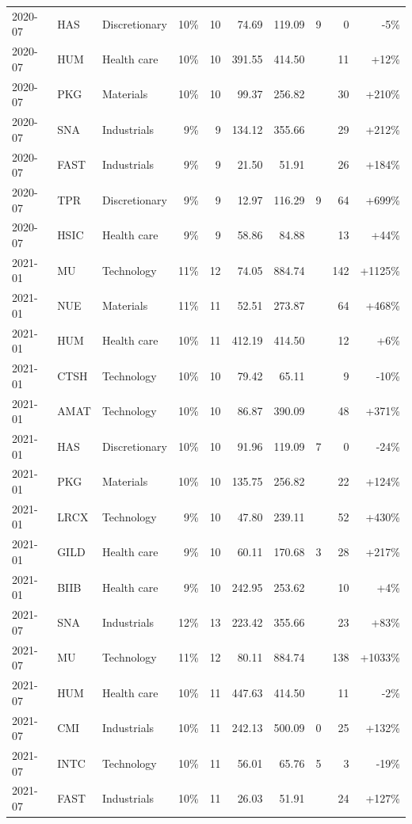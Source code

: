 \documentclass[11pt,a4paper]{article}
\begin{document}
{\begin{longtable}{l l l r r r r r r r}
2020-07 & HAS & Discretionary & 10\% & 10 & 74.69 & 119.09 & 9 & 0 & -5\% \\
2020-07 & HUM & Health care & 10\% & 10 & 391.55 & 414.50 &  & 11 & +12\% \\
2020-07 & PKG & Materials & 10\% & 10 & 99.37 & 256.82 &  & 30 & +210\% \\
2020-07 & SNA & Industrials & 9\% & 9 & 134.12 & 355.66 &  & 29 & +212\% \\
2020-07 & FAST & Industrials & 9\% & 9 & 21.50 & 51.91 &  & 26 & +184\% \\
2020-07 & TPR & Discretionary & 9\% & 9 & 12.97 & 116.29 & 9 & 64 & +699\% \\
2020-07 & HSIC & Health care & 9\% & 9 & 58.86 & 84.88 &  & 13 & +44\% \\
2021-01 & MU & Technology & 11\% & 12 & 74.05 & 884.74 &  & 142 & +1125\% \\
2021-01 & NUE & Materials & 11\% & 11 & 52.51 & 273.87 &  & 64 & +468\% \\
2021-01 & HUM & Health care & 10\% & 11 & 412.19 & 414.50 &  & 12 & +6\% \\
2021-01 & CTSH & Technology & 10\% & 10 & 79.42 & 65.11 &  & 9 & -10\% \\
2021-01 & AMAT & Technology & 10\% & 10 & 86.87 & 390.09 &  & 48 & +371\% \\
2021-01 & HAS & Discretionary & 10\% & 10 & 91.96 & 119.09 & 7 & 0 & -24\% \\
2021-01 & PKG & Materials & 10\% & 10 & 135.75 & 256.82 &  & 22 & +124\% \\
2021-01 & LRCX & Technology & 9\% & 10 & 47.80 & 239.11 &  & 52 & +430\% \\
2021-01 & GILD & Health care & 9\% & 10 & 60.11 & 170.68 & 3 & 28 & +217\% \\
2021-01 & BIIB & Health care & 9\% & 10 & 242.95 & 253.62 &  & 10 & +4\% \\
2021-07 & SNA & Industrials & 12\% & 13 & 223.42 & 355.66 &  & 23 & +83\% \\
2021-07 & MU & Technology & 11\% & 12 & 80.11 & 884.74 &  & 138 & +1033\% \\
2021-07 & HUM & Health care & 10\% & 11 & 447.63 & 414.50 &  & 11 & -2\% \\
2021-07 & CMI & Industrials & 10\% & 11 & 242.13 & 500.09 & 0 & 25 & +132\% \\
2021-07 & INTC & Technology & 10\% & 11 & 56.01 & 65.76 & 5 & 3 & -19\% \\
2021-07 & FAST & Industrials & 10\% & 11 & 26.03 & 51.91 &  & 24 & +127\% \\

\end{longtable}}
\end{document}
